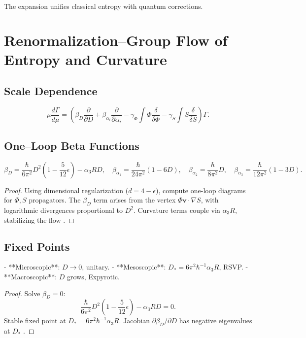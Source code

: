 \documentclass[12pt]{article}
\begin{document}
The expansion unifies classical entropy with quantum corrections.

\section{Renormalization–Group Flow of Entropy and Curvature}
\label{app:rg}

\subsection{Scale Dependence}

\[
\mu \frac{d \Gamma}{d \mu} = \left( \beta_D \frac{\partial}{\partial D} + \beta_{\alpha_i} \frac{\partial}{\partial \alpha_i} - \gamma_\Phi \int \Phi \frac{\delta}{\delta \Phi} - \gamma_S \int S \frac{\delta}{\delta S} \right) \Gamma.
\]

\subsection{One–Loop Beta Functions}

\[
\beta_D = \frac{\hbar}{6 \pi^2} D^2 \left(1 - \frac{5}{12} \epsilon \right) - \alpha_3 R D, \quad \beta_{\alpha_1} = \frac{\hbar}{24 \pi^2} (1 - 6D), \quad \beta_{\alpha_2} = \frac{\hbar}{8 \pi^2} D, \quad \beta_{\alpha_3} = \frac{\hbar}{12 \pi^2} (1 - 3D).
\]

\begin{proof}
Using dimensional regularization (\(d = 4 - \epsilon\)), compute one-loop diagrams for \(\Phi, S\) propagators. The \(\beta_D\) term arises from the vertex \(\Phi \mathbf{v} \cdot \nabla S\), with logarithmic divergences proportional to \(D^2\). Curvature terms couple via \(\alpha_3 R\), stabilizing the flow \citep{Wilson1983}.
\end{proof}

\subsection{Fixed Points}

- **Microscopic**: \(D \to 0\), unitary.
- **Mesoscopic**: \(D_* = 6 \pi^2 \hbar^{-1} \alpha_3 R\), RSVP.
- **Macroscopic**: \(D\) grows, Expyrotic.

\begin{proof}
Solve \(\beta_D = 0\):
\[
\frac{\hbar}{6 \pi^2} D^2 \left(1 - \frac{5}{12} \epsilon \right) - \alpha_3 R D = 0.
\]
Stable fixed point at \(D_* = 6 \pi^2 \hbar^{-1} \alpha_3 R\). Jacobian \(\partial \beta_D / \partial D\) has negative eigenvalues at \(D_*\) \citep{Wilson1983}.
\end{proof}
\end{document}
